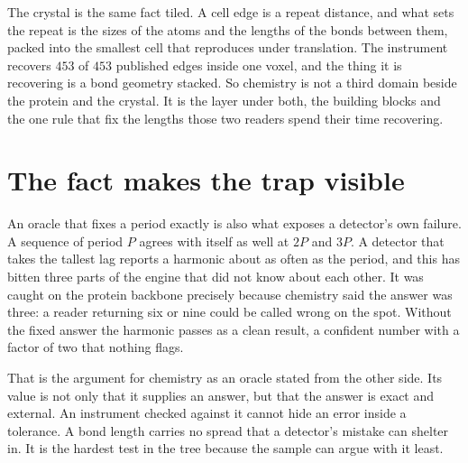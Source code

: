 The crystal is the same fact tiled. A cell edge is a repeat distance, and what sets the repeat is the
sizes of the atoms and the lengths of the bonds between them, packed into the smallest cell that
reproduces under translation. The instrument recovers $453$ of $453$ published edges inside one
voxel, and the thing it is recovering is a bond geometry stacked. So chemistry is not a third domain
beside the protein and the crystal. It is the layer under both, the building blocks and the one rule
that fix the lengths those two readers spend their time recovering.

\section{The fact makes the trap visible}

An oracle that fixes a period exactly is also what exposes a detector's own failure. A sequence of
period $P$ agrees with itself as well at $2P$ and $3P$. A detector that takes the tallest lag
reports a harmonic about as often as the period, and this has bitten three parts of the engine that
did not know about each other. It was caught on the protein backbone precisely because chemistry
said the answer was three: a reader returning six or nine could be called wrong on the spot. Without
the fixed answer the harmonic passes as a clean result, a confident number with a factor of two that
nothing flags.

That is the argument for chemistry as an oracle stated from the other side. Its value is not only
that it supplies an answer, but that the answer is exact and external. An instrument checked
against it cannot hide an error inside a tolerance. A bond length carries no spread that a detector's
mistake can shelter in. It is the hardest test in the tree because the sample can argue with it
least.
